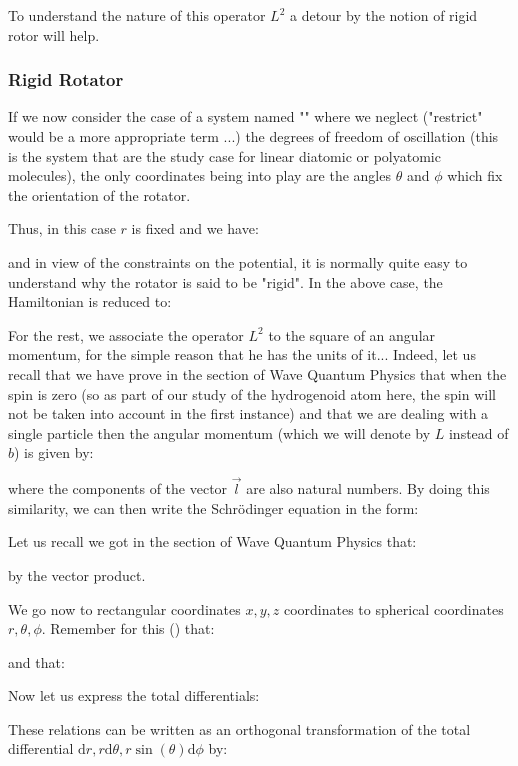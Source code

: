 	To understand the nature of this operator $L^2$ a detour by the notion of rigid rotor will help.
	
	\subsubsection{Rigid Rotator}\label{quantum chemistry rigid rotator}
	If we now consider the case of a system named "" where we neglect ("restrict" would be a more appropriate term ...) the degrees of freedom of oscillation (this is the system that are the study case for linear diatomic or polyatomic molecules), the only coordinates being into play are the angles $\theta$ and $\phi$ which fix the orientation of the rotator.
	
	Thus, in this case $r$ is fixed and we have:
	
	and in view of the constraints on the potential, it is normally quite easy to understand why the rotator is said to be "rigid". In the above case, the Hamiltonian is reduced to:
	
	
	For the rest, we associate the operator $L^2$ to the square of an angular momentum, for the simple reason that he has the units of it... Indeed, let us recall that we have prove in the section of Wave Quantum Physics that when the spin is zero (so as part of our study of the hydrogenoid atom here, the spin will not be taken into account in the first instance) and that we are dealing with a single particle then the angular momentum (which we will denote by $L$ instead of $b$) is given by:
	
	where the components of the vector $\vec{l}$ are also natural numbers. By doing this similarity, we can then write the Schrödinger equation in the form:
	
	Let us recall we got in the section of Wave Quantum Physics that:
	
	by the vector product.
	
	We go now to rectangular coordinates $x, y, z$ coordinates to spherical coordinates $r,\theta,\phi$. Remember for this () that:
	
	and that:
	
	Now let us express the total differentials:
	
	These relations can be written as an orthogonal transformation of the total differential $\mathrm{d}r,r\mathrm{d}\theta,r\sin(\theta)\mathrm{d}\phi$ by:
	
